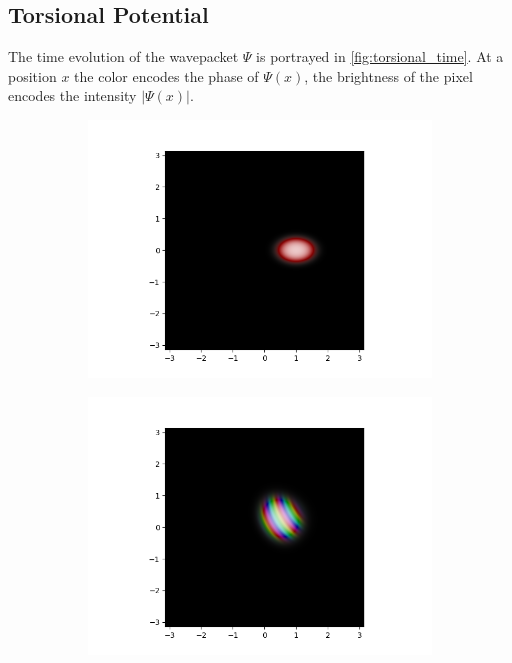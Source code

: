 \documentclass[11pt, a4paper, oneside]{article}
\begin{document}
\begin{appendices}
\subsection{Torsional Potential}
The time evolution of the wavepacket $\Psi$ is portrayed in \cref{fig:torsional_time}. At a position $x$ the color encodes the phase of $\Psi(x)$, the brightness of the pixel encodes the intensity $\lvert \Psi(x) \rvert$.
\begin{figure}[h]
  \begin{subfigure}[b]{0.5 \textwidth}
    \includegraphics[width = \textwidth]{graphics/torsional/wavefunction_contour_block_0_level_0_timestep_0000000.PNG}
  \end{subfigure}
  \hfill
  \begin{subfigure}[b]{0.5 \textwidth}
    \includegraphics[width = \textwidth]{graphics/torsional/wavefunction_contour_block_0_level_0_timestep_0000100.PNG}

\end{subfigure}
\end{figure}
\end{appendices}
\end{document}
